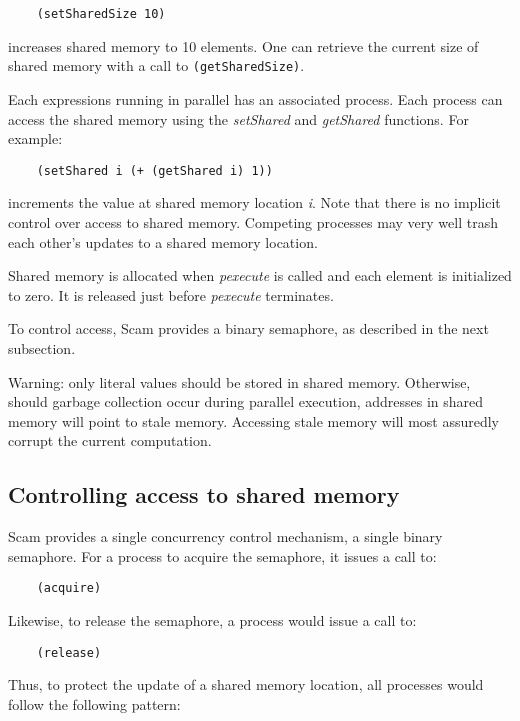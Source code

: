 \begin{verbatim}
    (setSharedSize 10)
\end{verbatim}

increases shared memory to 10 elements. One can retrieve the current size of
shared memory with a call to \verb!(getSharedSize)!.

Each expressions running in parallel has an associated process. Each process
can access the shared memory using the {\it setShared} and {\it getShared}
functions.  For example:

\begin{verbatim}
    (setShared i (+ (getShared i) 1))
\end{verbatim}

increments the value at shared memory location {\it i}. Note that there
is no implicit control over access to shared memory. Competing processes
may very well trash each other's updates to a shared memory location.

Shared memory is allocated when {\it pexecute} is called and each element
is initialized to zero. It is released
just before {\it pexecute} terminates. 

To control access, Scam provides a binary semaphore, as described
in the next subsection.

\color{red}
Warning:
\color{black}
only literal values should be stored in shared memory.
Otherwise, should garbage collection occur during parallel execution,
addresses in shared memory will point to stale memory. Accessing stale memory
will most assuredly corrupt the current computation.

\subsection{Controlling access to shared memory}

Scam provides a single concurrency control mechanism, a single binary
semaphore. For a process to acquire the semaphore, it issues a call to:

\begin{verbatim}
    (acquire)
\end{verbatim}

Likewise, to release the semaphore, a process would issue a call to:

\begin{verbatim}
    (release)
\end{verbatim}

Thus, to protect the update of a shared memory location, all processes
would follow the following pattern:

